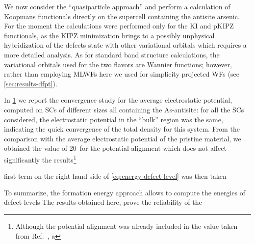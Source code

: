 We now consider the ``quasiparticle approach'' and perform a calculation of Koopmans functionals directly on the supercell containing the antisite arsenic. For the moment the calculations were performed only for the KI and pKIPZ functionals, as the KIPZ minimization brings to a possibly unphysical hybridization of the defects state with other variational orbitals which requires a more detailed analysis. As for standard band structure calculations, the variational orbitals used for the two flavors are Wannier functions; however, rather than employing MLWFs here we used for simplicity projected WFs (see \cref{sec:results-dfpt}).

In \cref{fig:avg-pot} we report the convergence study for the average electrostatic potential, computed on SCs of different sizes all containing the As-antisite: for all the SCs considered, the electrostatic potential in the ``bulk'' region was the same, indicating the quick convergence of the total density for this system. From the comparison with the average electrostatic potential of the pristine material, we obtained the value of 20~\mev for the potential alignment which does not affect significantly the results\footnote{
Although the potential alignment was already included in the value taken from Ref.~\cite{komsa_assessing_2011}, a 
}

first term on the right-hand side of \cref{eq:energy-defect-level} was then taken 

To summarize, the formation energy approach allows to compute the energies of defect levels The results obtained here, prove the reliability of the 


\begin{figure}
    \centering
    \usebox{\measurebox}
    \begin{minipage}{.48\linewidth}
        \vspace{5mm}
    \end{minipage}
    \caption[]{}
    \label{fig:avg-pot}
\end{figure}

